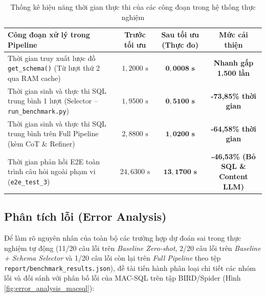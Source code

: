 \documentclass[12pt,a4paper]{report}
\begin{document}
\begin{table}[H]
\centering
\caption{Thống kê hiệu năng thời gian thực thi của các công đoạn trong hệ thống thực nghiệm}
\label{tab:latency_optimization}
\renewcommand{\arraystretch}{1.25}
\small
\begin{tabular}{@{}p{6.0cm}ccc@{}}
\toprule
\textbf{Công đoạn xử lý trong Pipeline} & \textbf{Trước tối ưu} & \textbf{Sau tối ưu (Thực đo)} & \textbf{Mức cải thiện} \\
\midrule
Thời gian truy xuất lược đồ \texttt{get\_schema()} (Từ lượt thứ 2 qua RAM cache) & $1{,}2000\text{ s}$ & $\mathbf{0{,}0008\text{ s}}$ & \textbf{Nhanh gấp 1.500 lần} \\
Thời gian sinh và thực thi SQL trung bình 1 lượt (Selector -- \texttt{run\_benchmark.py}) & $1{,}9500\text{ s}$ & $\mathbf{0{,}5100\text{ s}}$ & \textbf{-73,85\% thời gian} \\
Thời gian sinh và thực thi SQL trung bình trên Full Pipeline (kèm CoT \& Refiner) & $2{,}8800\text{ s}$ & $\mathbf{1{,}0200\text{ s}}$ & \textbf{-64,58\% thời gian} \\
Thời gian phản hồi E2E toàn trình câu hỏi ngoài phạm vi (\texttt{e2e\_test\_3}) & $24{,}6300\text{ s}$ & $\mathbf{13{,}1700\text{ s}}$ & \textbf{-46,53\% (Bỏ SQL \& Content LLM)} \\
\bottomrule
\end{tabular}
\end{table}

\subsection{Phân tích lỗi (Error Analysis)}

Để làm rõ nguyên nhân của toàn bộ các trường hợp dự đoán sai trong thực nghiệm tự động (11/20 câu lỗi trên \textit{Baseline Zero-shot}, 2/20 câu lỗi trên \textit{Baseline + Schema Selector} và 1/20 câu lỗi còn lại trên \textit{Full Pipeline} theo tệp \texttt{report/benchmark\_results.json}), đề tài tiến hành phân loại chi tiết các nhóm lỗi và đối sánh với phân bố lỗi của MAC-SQL trên tập BIRD/Spider (Hình \ref{fig:error_analysis_macsql}):
\end{document}
